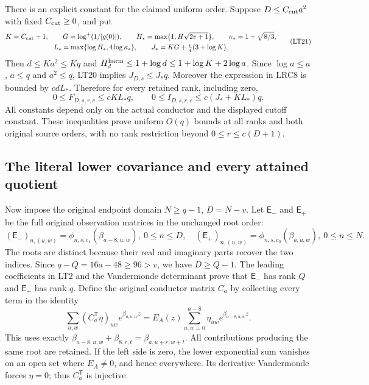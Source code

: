 There is an explicit constant for the claimed uniform order. Suppose
$D\le C_{\rm cut}a^2$ with fixed $C_{\rm cut}\ge0$, and put
\[
 \begin{gathered}
 K=C_{\rm cut}+1,\qquad G=\log^+(1/|g(0)|),\qquad
 H_* =\max\{1,H\sqrt{2v+1}\},\qquad
 \kappa_*=1+\sqrt{8/3},\\
 L_* =\max\{\log H_*,4\log\kappa_*\},\qquad
 J_*=KG+\tfrac v4(3+\log K).
 \end{gathered}                                                   \tag{LT21}
\]
Then $d\le Ka^2\le Kq$ and
$H_d^{\rm harm}\le1+\log d\le1+\log K+2\log a$.
Since $\log a\le a$, $a\le q$ and $a^2\le q$, LT20 implies
$J_{D,s}\le J_*q$. Moreover the expression in LRC8 is bounded by
$cdL_*$. Therefore for every retained rank, including zero,
\[
 0\le F_{D,s,r,c}\le cKL_*q,\qquad
 0\le I_{D,s,r,c}\le c(J_*+KL_*)q .                    \tag{LT22}
\]
All constants depend only on the actual conductor and the displayed
cutoff constant. These inequalities prove uniform $O(q)$ bounds at
all ranks and both original source orders, with no rank restriction
beyond $0\le r\le c(D+1)$.

\subsection{The literal lower covariance and every attained quotient}

Now impose the original endpoint domain $N\ge q-1$, $D=N-v$.
Let $\mathsf E_-$ and $\mathsf E_+$ be the full original observation
matrices in the unchanged root order:
\[
 (\mathsf E_-)_{n,(u,w)}=\phi_{n,s,c_1}(\beta_{a-8,u,w}),\ 0\le n\le D,
 \quad
 (\mathsf E_+)_{n,(u,w)}=\phi_{n,s,c_0}(\beta_{a,u,w}),\ 0\le n\le N.
                                                               \tag{LT23}
\]
The roots are distinct because their real and imaginary parts recover
the two indices. Since $q-Q=16a-48\ge96>v$, we have $D\ge Q-1$.
The leading coefficients in LT2 and the Vandermonde determinant prove
that $\mathsf E_-$ has rank $Q$ and $\mathsf E_+$ has rank $q$.
Define the original conductor matrix $C_a$ by collecting every term
in the identity
\[
 \sum_{u,w}(C_a^{\mathsf T}\eta)_{uw}e^{\beta_{a,u,w}z}
 =E_A(z)\sum_{u,w=0}^{a-8}\eta_{uw}e^{\beta_{a-8,u,w}z}.   \tag{LT24}
\]
This uses exactly
$\beta_{a-8,u,w}+\beta_{8,r,t}=\beta_{a,u+r,w+t}$.
All contributions producing the same root are retained.
If the left side is zero, the lower exponential sum vanishes on
an open set where $E_A\ne0$, and hence everywhere. Its derivative
Vandermonde forces $\eta=0$; thus $C_a^{\mathsf T}$ is injective.

